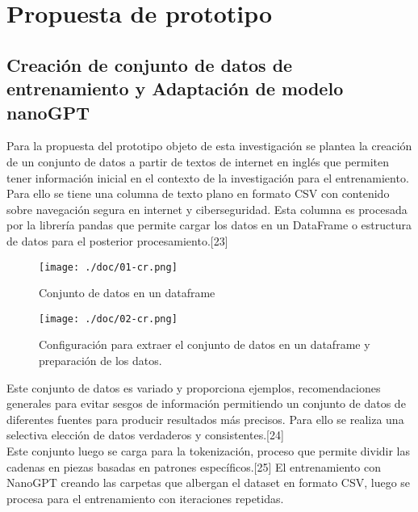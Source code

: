 \chapter{Propuesta de prototipo}\label{cap:capitulo4}

\section{Creación de conjunto de datos de entrenamiento y Adaptación de modelo nanoGPT}\label{section:Creación de conjunto de datos con fuentes de internet} 
Para la propuesta del prototipo objeto de esta investigación se plantea la creación de un conjunto de datos a partir de textos de internet en inglés que permiten tener información inicial en el contexto de la investigación para el entrenamiento. Para ello se tiene una columna de texto plano en formato CSV con contenido sobre navegación segura en internet y ciberseguridad. Esta columna es procesada por la librería pandas que permite cargar los datos en un DataFrame o estructura de datos para el posterior procesamiento.[23] \\
\begin{figure}[H]
   \centering %
       \texttt{[image: ./doc/01-cr.png]} 
   \caption{Conjunto de datos en un dataframe  \cite{}}
  \label{figure:Resultado 1}  %
\end{figure}
\begin{figure}[H]
   \centering %
       \texttt{[image: ./doc/02-cr.png]} 
   \caption{Configuración para extraer el conjunto de datos en un dataframe y preparación de los datos.  \cite{}}
  \label{figure:Resultado 1}  %
\end{figure}

Este conjunto de datos es variado y proporciona ejemplos, recomendaciones generales para evitar sesgos de información permitiendo un conjunto de datos de diferentes fuentes para producir resultados más precisos. Para ello se realiza una selectiva elección de datos verdaderos y consistentes.[24] \\
Este conjunto luego se carga para la tokenización, proceso que permite dividir las cadenas en piezas basadas en patrones específicos.[25] El entrenamiento con NanoGPT creando las carpetas que albergan el dataset en formato CSV, luego se procesa para el entrenamiento con iteraciones repetidas. \\

